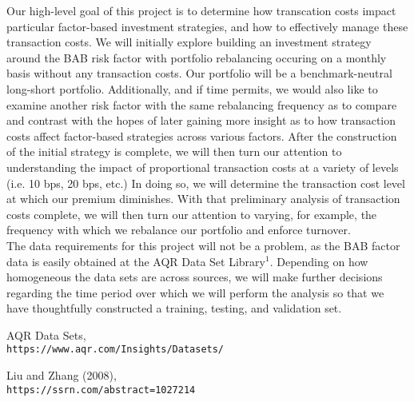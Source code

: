 \documentclass[12pt]{article}
\begin{document}
Our high-level goal of this project is to determine how transcation costs impact particular factor-based investment strategies, and how to effectively manage these transaction costs. We will initially explore building an investment strategy around the BAB risk factor with portfolio rebalancing occuring on a monthly basis without any transaction costs. Our portfolio will be a benchmark-neutral long-short portfolio. Additionally, and if time permits, we would also like to examine another risk factor with the same rebalancing frequency as to compare and contrast with the hopes of later gaining more insight as to how transaction costs affect factor-based strategies across various factors. After the construction of the initial strategy is complete, we will then turn our attention to understanding the impact of proportional transaction costs at a variety of levels (i.e. 10 bps, 20 bps, etc.) In doing so, we will determine the transaction cost level at which our premium diminishes. With that preliminary analysis of transaction costs complete, we will then turn our attention to varying, for example, the frequency with which we rebalance our portfolio and enforce turnover.  \\
The data requirements for this project will not be a problem, as the BAB factor data is easily obtained at the AQR Data Set Library$^{1}$. Depending on how homogeneous the data sets are across sources, we will make further decisions regarding the time period over which we will perform the analysis so that we have thoughtfully constructed a training, testing, and validation set.  

\begin{thebibliography}{9}
AQR Data Sets,
\\\texttt{https://www.aqr.com/Insights/Datasets/}

Liu and Zhang (2008),
\\\texttt{https://ssrn.com/abstract=1027214}
\end{thebibliography}
\end{document}
